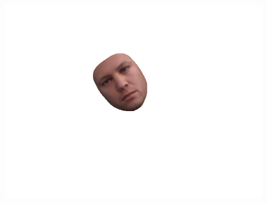 \begin{figure}[h]
\begin{minipage}{.325\textwidth}
      \includegraphics[width=0.99\textwidth]{Figures/dataset/2D/6.png}
    \end{minipage}


\end{figure}
